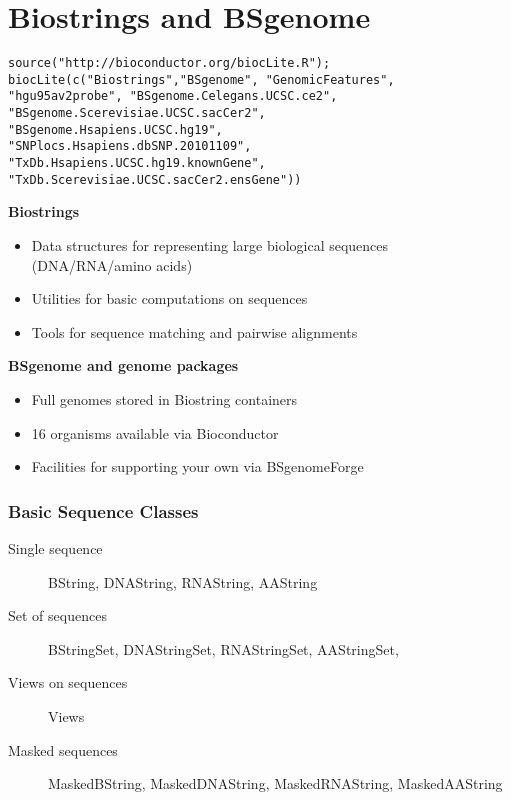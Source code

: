 \documentclass[pdf]{beamer}
\begin{document}
\section{Biostrings and BSgenome}
\begin{frame}[fragile]
\begin{footnotesize}
\begin{verbatim}
source("http://bioconductor.org/biocLite.R"); 
biocLite(c("Biostrings","BSgenome", "GenomicFeatures", 
"hgu95av2probe", "BSgenome.Celegans.UCSC.ce2", 
"BSgenome.Scerevisiae.UCSC.sacCer2", 
"BSgenome.Hsapiens.UCSC.hg19", 
"SNPlocs.Hsapiens.dbSNP.20101109",
"TxDb.Hsapiens.UCSC.hg19.knownGene", 
"TxDb.Scerevisiae.UCSC.sacCer2.ensGene"))
\end{verbatim}
\end{footnotesize}
\end{frame}

\begin{frame}
  \textbf{Biostrings}
  \begin{itemize}
  \item Data structures for representing large biological sequences (DNA/RNA/amino acids)
  \item Utilities for basic computations on sequences
  \item Tools for sequence matching and pairwise alignments
  \end{itemize}
  \textbf{BSgenome and genome packages}
  \begin{itemize}
  \item Full genomes stored in Biostring containers
  \item 16 organisms available via Bioconductor
  \item Facilities for supporting your own via BSgenomeForge
  \end{itemize}
\end{frame}

\begin{frame}
  \frametitle{Basic Sequence Classes}
  \begin{description}
  \item[Single sequence] BString, DNAString, RNAString, AAString
  \item[Set of sequences] BStringSet, DNAStringSet, RNAStringSet, AAStringSet, 
  \item[Views on sequences] Views
  \item[Masked sequences] MaskedBString, MaskedDNAString, MaskedRNAString, MaskedAAString
  \end{description}
\end{frame}
\end{document}
